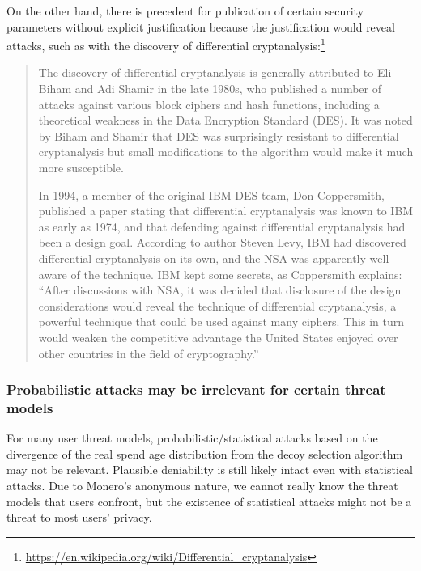 \documentclass[english]{article}
\begin{document}
On the other hand, there is precedent for publication of certain security
parameters without explicit justification because the justification
would reveal attacks, such as with the discovery of differential cryptanalysis:\footnote{\href{https://en.wikipedia.org/wiki/Differential_cryptanalysis}{https://en.wikipedia.org/wiki/Differential\_cryptanalysis}}
\begin{quote}
The discovery of differential cryptanalysis is generally attributed
to Eli Biham and Adi Shamir in the late 1980s, who published a number
of attacks against various block ciphers and hash functions, including
a theoretical weakness in the Data Encryption Standard (DES). It was
noted by Biham and Shamir that DES was surprisingly resistant to differential
cryptanalysis but small modifications to the algorithm would make
it much more susceptible.

In 1994, a member of the original IBM DES team, Don Coppersmith, published
a paper stating that differential cryptanalysis was known to IBM as
early as 1974, and that defending against differential cryptanalysis
had been a design goal. According to author Steven Levy, IBM had discovered
differential cryptanalysis on its own, and the NSA was apparently
well aware of the technique. IBM kept some secrets, as Coppersmith
explains: ``After discussions with NSA, it was decided that disclosure
of the design considerations would reveal the technique of differential
cryptanalysis, a powerful technique that could be used against many
ciphers. This in turn would weaken the competitive advantage the United
States enjoyed over other countries in the field of cryptography.''
\end{quote}

\subsubsection{Probabilistic attacks may be irrelevant for certain threat models}

For many user threat models, probabilistic/statistical attacks based
on the divergence of the real spend age distribution from the decoy
selection algorithm may not be relevant. Plausible deniability is
still likely intact even with statistical attacks. Due to Monero's
anonymous nature, we cannot really know the threat models that users
confront, but the existence of statistical attacks might not be a
threat to most users' privacy.
\end{document}
